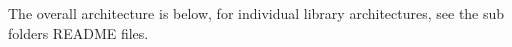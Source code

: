 The overall architecture is below, for individual library architectures, see the sub folders README files.

 